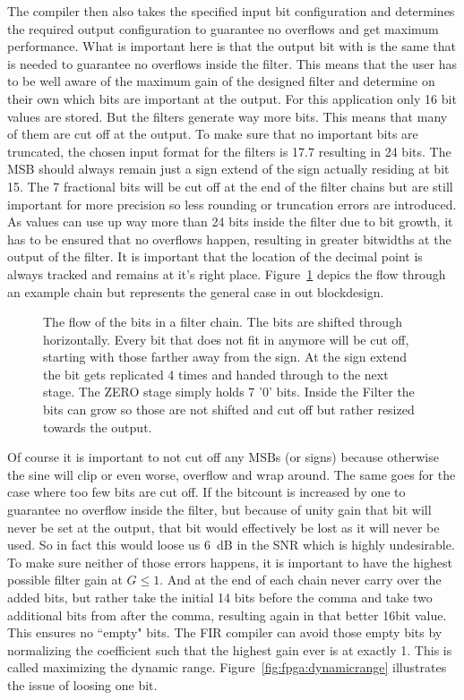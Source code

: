 The compiler then also takes the specified input bit configuration and determines the required output configuration to guarantee no overflows and get maximum performance.
What is important here is that the output bit with is the same that is needed to guarantee no overflows inside the filter. This means that the user has to be well aware of the maximum gain of the designed filter and determine on their own which bits are important at the output.
For this application only 16 bit values are stored. But the filters generate way more bits. This means that many of them are cut off at the output.
To make sure that no important bits are truncated, the chosen input format for the filters is 17.7 resulting in 24 bits. The MSB should always remain just a sign extend of the sign actually residing at bit 15. The 7 fractional bits will be cut off at the end of the filter chains but are still important for more precision so less rounding or truncation errors are introduced.
As values can use up way more than 24 bits inside the filter due to bit growth, it has to be ensured that no overflows happen, resulting in greater bitwidths at the output of the filter.
It is important that the location of the decimal point is always tracked and remains at it's right place.
Figure~\ref{fig:fpga:bitflow} depics the flow through an example chain but represents the general case in out blockdesign.

\begin{figure}
    \centering
    
    \caption{The flow of the bits in a filter chain. The bits are shifted through horizontally. Every bit that does not fit in anymore will be cut off, starting with those farther away from the sign. At the sign extend the bit gets replicated 4 times and handed through to the next stage. The ZERO stage simply holds 7 '0' bits. Inside the Filter the bits can grow so those are not shifted and cut off but rather resized towards the output.}
    \label{fig:fpga:bitflow}
\end{figure}

Of course it is important to not cut off any MSBs (or signs) because otherwise the sine will clip or even worse, overflow and wrap around. The same goes for the case where too few bits are cut off. If the bitcount is increased by one to guarantee no overflow inside the filter, but because of unity gain that bit will never be set at the output, that bit would effectively be lost as it will never be used.
So in fact this would loose us \SI{6}{\dB} in the SNR which is highly undesirable.
To make sure neither of those errors happens, it is important to have the highest possible filter gain at $G \leq 1$. And at the end of each chain never carry over the added bits, but rather take the initial 14 bits before the comma and take two additional bits from after the comma, resulting again in that better 16bit value. This ensures no ``empty" bits.
The FIR compiler can avoid those empty bits by normalizing the coefficient such that the highest gain ever is at exactly 1.
This is called maximizing the dynamic range. Figure~\ref{fig:fpga:dynamicrange} illustrates the issue of loosing one bit.

